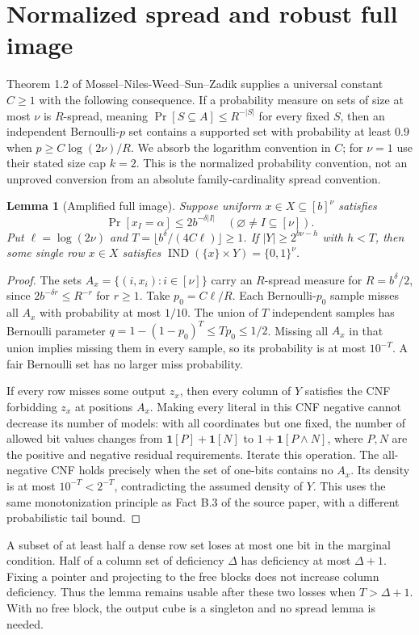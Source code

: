 \documentclass[11pt]{article}
\newtheorem{lemma}[theorem]{Lemma}
\newcommand{\IND}{\operatorname{IND}}
\begin{document}
\section{Normalized spread and robust full image}
Theorem 1.2 of Mossel--Niles-Weed--Sun--Zadik supplies a universal constant
$C\ge1$ with the following consequence. If a probability measure on sets of
size at most $\nu$ is $R$-spread, meaning
$\Pr[S\subseteq A]\le R^{-|S|}$ for every fixed $S$, then an independent
Bernoulli-$p$ set contains a supported set with probability at least $0.9$
when $p\ge C\log(2\nu)/R$. We absorb the logarithm convention in $C$;
for $\nu=1$ use their stated size cap $k=2$. This is the normalized
probability convention, not an unproved conversion from an absolute
family-cardinality spread convention.

\begin{lemma}[Amplified full image]
Suppose uniform $x\in X\subseteq[b]^\nu$ satisfies
\[
 \Pr[x_I=\alpha]\le2b^{-\delta|I|}\quad(\varnothing\ne I\subseteq[\nu]).
\]
Put $\ell=\log(2\nu)$ and
$T=\lfloor b^\delta/(4C\ell)\rfloor\ge1$. If
$|Y|\ge2^{b\nu-h}$ with $h<T$, then some single row $x\in X$ satisfies
$\IND(\{x\}\times Y)=\{0,1\}^\nu$.
\end{lemma}
\begin{proof}
The sets $A_x=\{(i,x_i):i\in[\nu]\}$ carry an $R$-spread measure for
$R=b^\delta/2$, since $2b^{-\delta r}\le R^{-r}$ for $r\ge1$.
Take $p_0=C\ell/R$. Each Bernoulli-$p_0$ sample misses all $A_x$ with
probability at most $1/10$. The union of $T$ independent samples has
Bernoulli parameter $q=1-(1-p_0)^T\le Tp_0\le1/2$. Missing all $A_x$ in
that union implies missing them in every sample, so its probability is at
most $10^{-T}$. A fair Bernoulli set has no larger miss probability.

If every row misses some output $z_x$, then every column of $Y$ satisfies
the CNF forbidding $z_x$ at positions $A_x$. Making every literal in this
CNF negative cannot decrease its number of models: with all coordinates
but one fixed, the number of allowed bit values changes from
$\mathbf1[P]+\mathbf1[N]$ to $1+\mathbf1[P\land N]$, where $P,N$ are the
positive and negative residual requirements. Iterate this operation.
The all-negative CNF holds precisely when the set of one-bits contains no
$A_x$. Its density is at most $10^{-T}<2^{-T}$, contradicting the assumed
density of $Y$. This uses the same monotonization principle as Fact B.3
of the source paper, with a different probabilistic tail bound.
\end{proof}
A subset of at least half a dense row set loses at most one bit in the
marginal condition. Half of a column set of deficiency $\Delta$ has
deficiency at most $\Delta+1$. Fixing a pointer and projecting to the free
blocks does not increase column deficiency. Thus the lemma remains usable
after these two losses when $T>\Delta+1$. With no free block, the output
cube is a singleton and no spread lemma is needed.
\end{document}
